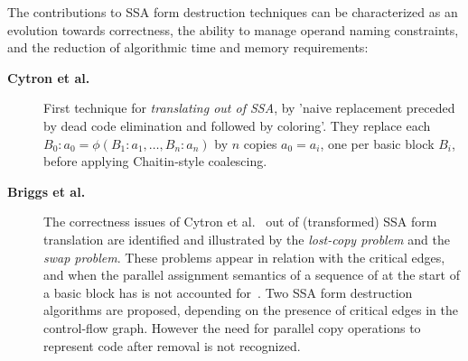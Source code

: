 The contributions to SSA form destruction techniques can be characterized as an
evolution towards correctness, the ability to manage operand naming constraints,
and the reduction of algorithmic time and memory requirements:
\begin{description}

\item[\textbf{Cytron et al.~\cite{Cytron:1991:TOPLAS}}] First technique for
\emph{translating out of SSA}, by 'naive replacement preceded by dead code
elimination and followed by coloring'. They replace each \phifun
$B_0:a_0=\phi(B_1:a_1,\dots,B_n:a_n)$ by $n$ copies $a_0 = a_i$, one per basic
block $B_i$, before applying Chaitin-style coalescing.

\item[\textbf{Briggs et al.~\cite{BriggsSSA}}] The correctness issues of
Cytron et al.~\cite{Cytron:1991:TOPLAS} out of (transformed) SSA form
translation are identified and illustrated by the \emph{lost-copy problem} and the
\emph{swap problem}. These problems appear in relation with the critical edges,
and when the parallel assignment semantics of a sequence of \phifuns at the
start of a basic block has is not accounted for~\cite{boissinot09revisiting}. Two SSA form
destruction algorithms are proposed, depending on the presence of critical edges
in the control-flow graph. However the need for parallel copy operations to
represent code after \phifun removal is not recognized.


\end{description}
